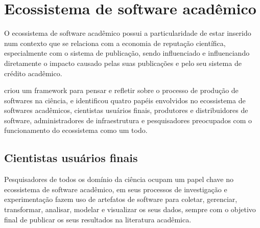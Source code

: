 \section{Ecossistema de software acadêmico}

O ecossistema de software acadêmico possui a particularidade de estar inserido
num contexto que se relaciona com a economia de reputação científica,
especialmente com o sistema de publicação, sendo influenciado e influenciando
diretamente o impacto causado pelas suas publicações e pelo seu sistema de crédito
acadêmico.


 criou um framework para pensar e refletir
sobre o processo de produção de softwares na ciência, e identificou quatro
papéis envolvidos no ecossistema de softwares acadêmicos, cientistas usuários
finais, produtores e distribuidores de software, administradores de
infraestrutura e pesquisadores preocupados com o funcionamento do ecossistema
como um todo.

%

\subsection{Cientistas usuários finais}

Pesquisadores de todos os domínio da ciência ocupam um papel chave no
ecossistema de software acadêmico, em seus processos de investigação e
experimentação fazem uso de artefatos de software para coletar, gerenciar,
transformar, analisar, modelar e visualizar os seus dados, sempre com o
objetivo final de publicar os seus resultados na literatura acadêmica.

